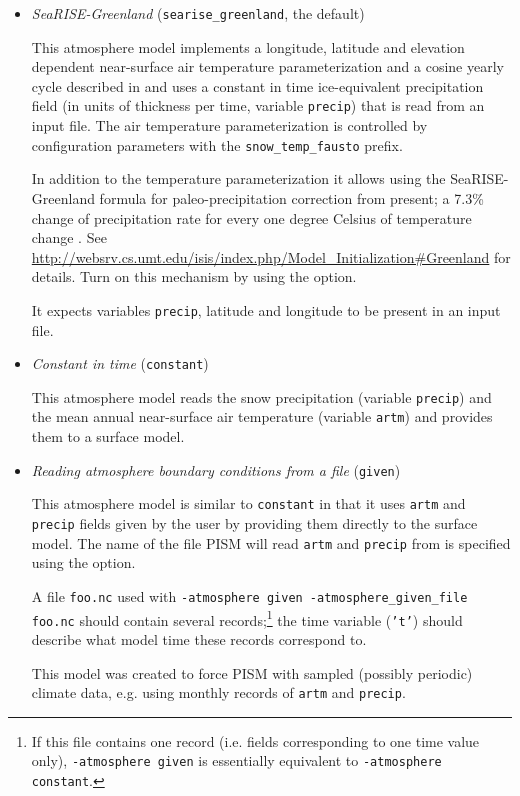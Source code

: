 \begin{itemize}
  \item \emph{SeaRISE-Greenland} (\texttt{searise_greenland}, the default)

    This atmosphere model implements a longitude, latitude and elevation dependent near-surface air temperature parameterization and a cosine yearly cycle described in \cite{Faustoetal2009} and uses a constant in time ice-equivalent precipitation field (in units of thickness per time, variable \texttt{precip}) that is read from an input file.  The air temperature parameterization is controlled by configuration parameters with the \texttt{snow_temp_fausto} prefix.

    In addition to the temperature parameterization it allows using the SeaRISE-Greenland formula for paleo-precipitation correction from present; a 7.3\% change of precipitation rate for every one degree Celsius of temperature change \cite{Huybrechts02}.  See \url{http://websrv.cs.umt.edu/isis/index.php/Model_Initialization#Greenland} for details.  Turn on this mechanism by using the  option.

    It expects variables \texttt{precip}, latitude and longitude to be present in an input file.

 \item \emph{Constant in time} (\texttt{constant})

    This atmosphere model reads the snow precipitation (variable \texttt{precip}) and the mean annual near-surface air temperature (variable \texttt{artm}) and provides them to a surface model.

  \item \emph{Reading atmosphere boundary conditions from a file} (\texttt{given})

    This atmosphere model is similar to \texttt{constant} in that it uses \texttt{artm} and \texttt{precip} fields given by the user by providing them directly to the surface model. The name of the file PISM will read \texttt{artm} and \texttt{precip} from is specified using the  option.

    A file \texttt{foo.nc} used with \texttt{-atmosphere given -atmosphere_given_file foo.nc} should contain several records;\footnote{If this file contains one record (i.e. fields corresponding to one time value only), \texttt{-atmosphere given} is essentially equivalent to \texttt{-atmosphere constant}.} the time variable (\texttt{'t'}) should describe what model time these records correspond to.

    This model was created to force PISM with sampled (possibly periodic) climate data, e.g. using monthly records of \texttt{artm} and \texttt{precip}.

  \end{itemize}

